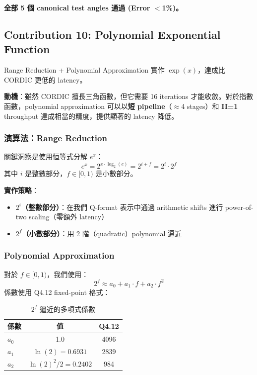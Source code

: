\documentclass[journal]{IEEEtran}
\newcommand{\tagit}[1]{\textit{#1}}
\newcommand{\Goal}{\tagit{目標：}}
\begin{document}
\textbf{全部 5 個 canonical test angles 通過 (Error $<$1\%)。}

\subsection{Contribution 10: Polynomial Exponential Function}

 Range Reduction + Polynomial Approximation 實作 $\exp(x)$，達成比 CORDIC 更低的 latency。

\textbf{動機}：雖然 CORDIC 擅長三角函數，但它需要 16 iterations 才能收斂。對於指數函數，polynomial approximation 可以以\textbf{短 pipeline}（$\approx$4 stages）和 \textbf{II=1} throughput 達成相當的精度，提供顯著的 latency 降低。

\subsubsection{演算法：Range Reduction}
關鍵洞察是使用恒等式分解 $e^x$：
\begin{equation}
e^x = 2^{x \cdot \log_2(e)} = 2^{i+f} = 2^i \cdot 2^f
\end{equation}
其中 $i$ 是整數部分，$f \in [0,1)$ 是小數部分。

\textbf{實作策略}：
\begin{itemize}
    \item \textbf{$2^i$（整數部分）}：在我們 Q-format 表示中通過 arithmetic shifts 進行 power-of-two scaling（零額外 latency）
    \item \textbf{$2^f$（小數部分）}：用 2 階（quadratic）polynomial 逼近
\end{itemize}

\subsubsection{Polynomial Approximation}
對於 $f \in [0, 1)$，我們使用：
\begin{equation}
2^f \approx a_0 + a_1 \cdot f + a_2 \cdot f^2
\end{equation}
係數使用 Q4.12 fixed-point 格式：
\begin{table}[!t]
\centering
\caption{$2^f$ 逼近的多項式係數}
\footnotesize
\begin{tabular}{@{}lcc@{}}
\toprule
\textbf{係數} & \textbf{值} & \textbf{Q4.12} \\
\midrule
$a_0$ & 1.0 & 4096 \\
$a_1$ & $\ln(2) = 0.6931$ & 2839 \\
$a_2$ & $\ln(2)^2/2 = 0.2402$ & 984 \\
\bottomrule
\end{tabular}
\end{table}
\end{document}
